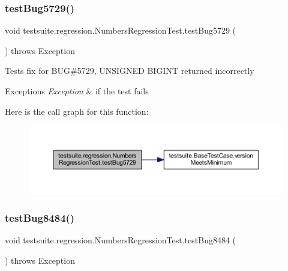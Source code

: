 \subsubsection{\texorpdfstring{test\+Bug5729()}{testBug5729()}}
{\footnotesize\ttfamily void testsuite.\+regression.\+Numbers\+Regression\+Test.\+test\+Bug5729 (\begin{DoxyParamCaption}{ }\end{DoxyParamCaption}) throws Exception}

Tests fix for B\+UG\#5729, U\+N\+S\+I\+G\+N\+ED B\+I\+G\+I\+NT returned incorrectly


\begin{DoxyExceptions}{Exceptions}
{\em Exception} & if the test fails \\
\hline
\end{DoxyExceptions}
Here is the call graph for this function\+:
\nopagebreak
\begin{figure}[H]
\begin{center}
\leavevmode
\includegraphics[width=350pt]{classtestsuite_1_1regression_1_1_numbers_regression_test_a8b734d31cfe73a510c1e2c9a5f2d049f_cgraph}
\end{center}
\end{figure}
\mbox{\label{classtestsuite_1_1regression_1_1_numbers_regression_test_a28ea888d744588001519dd5cafde7074}} 
\subsubsection{\texorpdfstring{test\+Bug8484()}{testBug8484()}}
{\footnotesize\ttfamily void testsuite.\+regression.\+Numbers\+Regression\+Test.\+test\+Bug8484 (\begin{DoxyParamCaption}{ }\end{DoxyParamCaption}) throws Exception}

